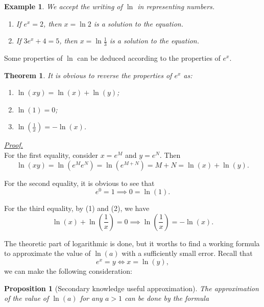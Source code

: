 \documentclass[12pt]{article}
\newtheorem*{theorem}{Theorem}
\newtheorem*{proposition}{Proposition}
\newtheorem*{example}{Example}
\renewenvironment{proof}[1][Proof]{\begin{snugshade*} \underline{\textit{{#1}.}}\\}{\hfill \qedsymbol \end{snugshade*}}
\begin{document}
    \begin{example}
        We accept the writing of $\ln$ in representing numbers.\begin{enumerate}
            \item If $e^x=2$, then $x=\ln{2}$ is a solution to the equation.
            \item If $3e^x+4=5$, then $x=\ln{\frac{1}{3}}$ is a solution to the equation.
        \end{enumerate}
    \end{example}

    Some properties of $\ln$ can be deduced according to the properties of $e^x$.

    \begin{theorem}
        It is obvious to reverse the properties of $e^x$ as:\begin{enumerate}
            \item $\ln(xy)=\ln(x)+\ln(y)$;
            \item $\ln(1)=0$;
            \item $\ln(\frac{1}{x})=-\ln(x)$.
        \end{enumerate}
    \end{theorem}

    \begin{proof}
        For the first equality, consider $x=e^M$ and $y=e^N$. Then \[\ln(xy)=\ln(e^M e^N)=\ln(e^{M+N})=M+N=\ln(x)+\ln(y).\]

        For the second equality, it is obvious to see that \[e^0=1 \implies 0=\ln(1).\]

        For the third equality, by (1) and (2), we have \[\ln(x)+\ln(\frac{1}{x})=0 \implies \ln(\frac{1}{x})=-\ln(x).\]
    \end{proof}

    The theoretic part of logarithmic is done, but it worths to find a working formula to approximate the value of $\ln(a)$ with a sufficiently small error. Recall that \[e^x=y \iff x=\ln(y),\] we can make the following consideration:

    \begin{proposition}[Secondary knowledge useful approximation]
        The approximation of the value of $\ln(a)$ for any $a>1$ can be done by the formula 
    \end{proposition}
\end{document}
